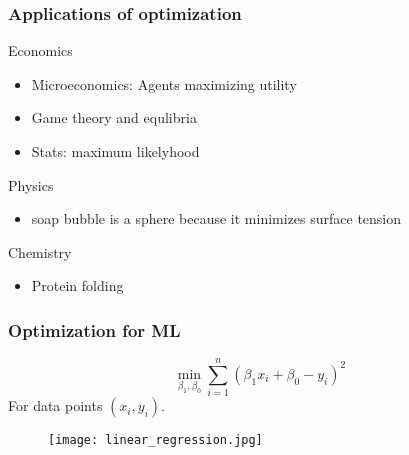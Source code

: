 \documentclass{beamer}
\begin{document}
\begin{frame}
  \frametitle{Applications of optimization}

  Economics
  \begin{itemize}
    \item Microeconomics: Agents maximizing utility
    \item Game theory and equlibria
    \item Stats: maximum likelyhood
  \end{itemize}
  Physics
  \begin{itemize}
    \item soap bubble is a sphere because it minimizes surface tension
  \end{itemize}
  Chemistry
  \begin{itemize}
    \item Protein folding
  \end{itemize}

\end{frame}

\begin{frame}
  \frametitle{Optimization for ML}
  \begin{minipage}{0.5\textwidth}
    \begin{equation}
      \min_{\beta_1, \beta_0} \sum_{i=1}^{n} {( \beta_1 x_i + \beta_0 - y_i)}^2
    \end{equation}
    For data points $(x_i, y_i)$.
  \end{minipage}
  \hfill
  \begin{minipage}{0.45\textwidth}
    \begin{figure}[ht]
      \centering
      \texttt{[image: linear\_regression.jpg]}
    \end{figure}

  \end{minipage}


\end{frame}
\end{document}
